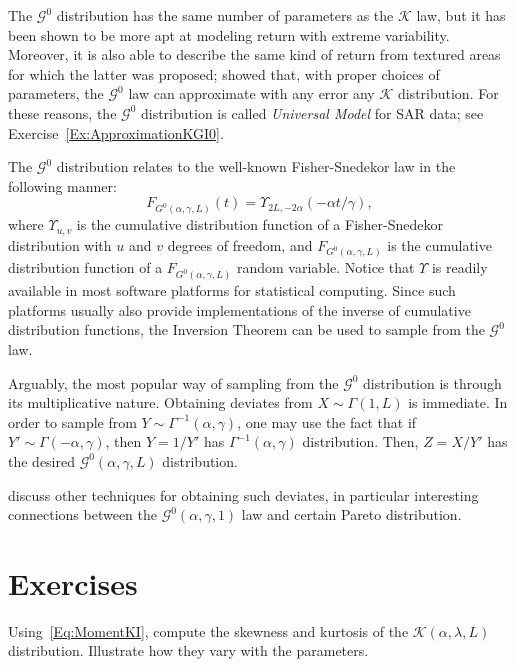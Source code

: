 The $\mathcal{G}^0$ distribution has the same number of parameters as the $\mathcal{K}$ law, but it has been shown to be more apt at modeling return with extreme variability.
Moreover, it is also able to describe the same kind of return from textured areas for which the latter was proposed; \citet{MejailJacoboFreryBustos:IJRS} showed that, with proper choices of parameters, the $\mathcal G^0$ law can approximate with any error any $\mathcal K$ distribution.
For these reasons, the $\mathcal G^0$ distribution is called \textit{Universal Model} for SAR data; see Exercise~\ref{Ex:ApproximationKGI0}.

The $\mathcal G^0$ distribution relates to the well-known Fisher-Snedekor law in the following manner:
\begin{equation}
F_{G^0(\alpha,\gamma,L)}(t) = \Upsilon_{2L,−2\alpha}(−\alpha t/\gamma),
\end{equation}
where $\Upsilon_{u,v}$ is the cumulative distribution function of a Fisher-Snedekor distribution with $u$ and $v$ degrees of freedom, and $F_{G^0(\alpha,\gamma,L)}$ is the cumulative distribution function of a $F_{G^0(\alpha,\gamma,L)}$ random variable.
Notice that $\Upsilon$ is readily available in most software platforms for statistical computing.
Since such platforms usually also provide implementations of the inverse of cumulative distribution functions, the Inversion Theorem can be used to sample from the $\mathcal G^0$ law.

Arguably, the most popular way of sampling from the $\mathcal G^0$ distribution is through its multiplicative nature.
Obtaining deviates from $X\sim\Gamma(1,L)$ is immediate.
In order to sample from $Y\sim\Gamma^{-1}(\alpha,\gamma)$, one may use the fact that if $Y'\sim\Gamma(-\alpha,\gamma)$, then $Y=1/Y'$ has $\Gamma^{-1}(\alpha,\gamma)$ distribution.
Then, $Z=X/Y'$ has the desired $\mathcal G^0(\alpha,\gamma,L)$ distribution.

\citet{IGARSSChan2017} discuss other techniques for obtaining such deviates, in particular interesting connections between the $\mathcal G^0(\alpha,\gamma,1)$ law and certain Pareto distribution.


\section*{Exercises}

\begin{exer}
Using~\eqref{Eq:MomentKI}, compute the skewness and kurtosis of the $\mathcal K(\alpha,\lambda,L)$ distribution.
Illustrate how they vary with the parameters.
\end{exer}

